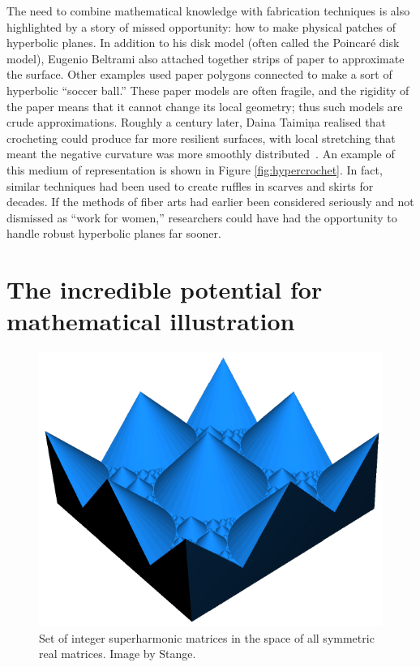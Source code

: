 \documentclass{notices}
\begin{document}
The need to combine mathematical knowledge with fabrication techniques is also highlighted by a story of missed opportunity: how to make physical patches of hyperbolic planes. In addition to his disk model (often called the Poincaré disk model), Eugenio Beltrami also attached together strips of paper to approximate the surface. Other examples used paper polygons connected to make a sort of hyperbolic ``soccer ball.'' These paper models are often fragile, and the rigidity of the paper means that it cannot change its local geometry; thus such models are crude approximations. Roughly a century later, Daina Taimiņa realised that crocheting could produce far more resilient surfaces, with local stretching that meant the negative curvature was more smoothly distributed~\cite{Taimina:CAWHP}. An example of this medium of representation is shown in Figure \ref{fig:hypercrochet}. In fact, similar techniques had been used to create ruffles in scarves and skirts for decades. If the methods of fiber arts had earlier been considered seriously and not dismissed as ``work for women,'' researchers could have had the opportunity to handle robust hyperbolic planes far sooner. 

\section*{The incredible potential for mathematical illustration}

\begin{figure}
    \includegraphics[width=1.\linewidth]{images/Gamma-cropped.pdf}
    \caption{Set of integer superharmonic matrices in the space of all symmetric real matrices. Image by Stange.}
    \label{fig:gamma}
\end{figure}
\end{document}

